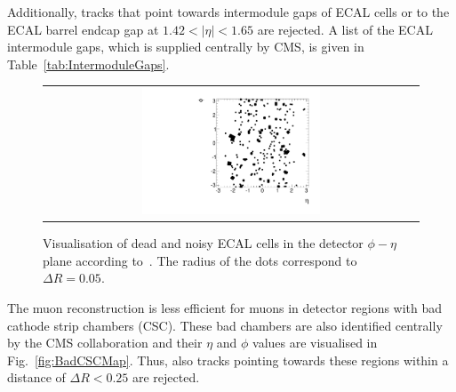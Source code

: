 Additionally, tracks that point towards intermodule gaps of ECAL cells or to the ECAL barrel endcap gap at $1.42<|\eta|<1.65$ are rejected.
A list of the ECAL intermodule gaps, which is supplied centrally by CMS, is given in Table~\ref{tab:IntermoduleGaps}.

\begin{figure}[!t]
  \vspace{10pt}
  \centering 
  \begin{tabular}{c}
    \includegraphics[width=0.49\textwidth]{figures/analysis/DeadECALMap2.pdf}
  \end{tabular}
  \caption{Visualisation of dead and noisy ECAL cells in the detector $\phi - \eta$ plane according to~\cite{bib:CMS:DT_Thesis,bib:CMS:DT_8TeV_AN}.
           The radius of the dots correspond to $\Delta R=0.05$.}
  \label{fig:DeadECALmap}
  \vspace{10pt}
\end{figure}




The muon reconstruction is less efficient for muons in detector regions with bad cathode strip chambers (CSC).
These bad chambers are also identified centrally by the CMS collaboration and their $\eta$ and $\phi$ values are visualised in Fig.~\ref{fig:BadCSCMap}.
Thus, also tracks pointing towards these regions within a distance of $\Delta R<0.25$ are rejected.

\renewcommand{\arraystretch}{1.5}
\begin{table}[!b]
\centering
\caption{Intermodule ECAL gaps.}
\label{tab:IntermoduleGaps}
\vspace{50pt}
\end{table}  

